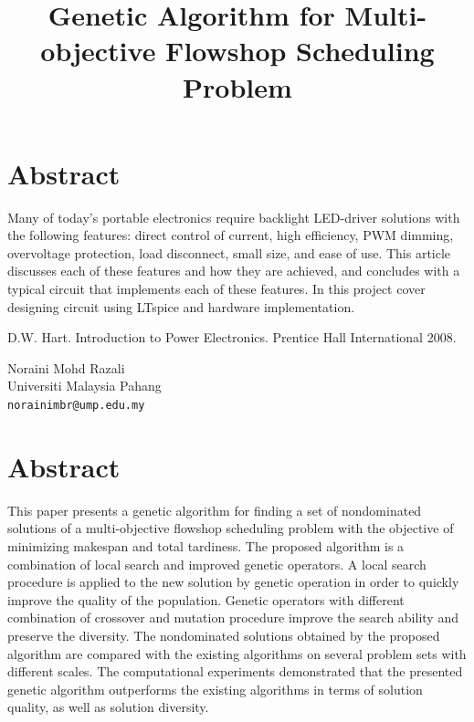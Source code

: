\documentclass[article, A4, 11pt]{llncs}%
\begin{document}
\section*{Abstract}
Many of today’s portable electronics require backlight LED-driver solutions with the following features: direct control of current, high efficiency, PWM dimming, overvoltage protection, load disconnect, small size, and ease of use. This article discusses each of these features and how they are achieved, and concludes with a typical circuit that implements each of these features. In this project cover designing circuit using LTspice and hardware implementation.


\begin{thebibliography}{10}
{\sc D.W. Hart}. {Introduction to Power Electronics}. Prentice Hall International 2008.
\end{thebibliography} %

\title{Genetic Algorithm for Multi-objective Flowshop Scheduling Problem}
 \author{} \institute{}
\maketitle
\begin{center}
{\large Noraini Mohd Razali}\\
Universiti Malaysia Pahang\\
{\tt norainimbr@ump.edu.my}
\end{center}

\section*{Abstract}
This paper presents a genetic algorithm for finding a set of nondominated solutions of a multi-objective flowshop scheduling problem with the objective of minimizing makespan and total tardiness. The proposed algorithm is a combination of local search and improved genetic operators. A local search procedure is applied to the new solution by genetic operation in order to quickly improve the quality of the population. Genetic operators with different combination of crossover and mutation procedure improve the search ability and preserve the diversity. The nondominated solutions obtained by the proposed algorithm are compared with the existing algorithms on several problem sets with different scales. The computational experiments demonstrated that the presented genetic algorithm outperforms the existing algorithms in terms of solution quality, as well as solution diversity.
\end{document}
